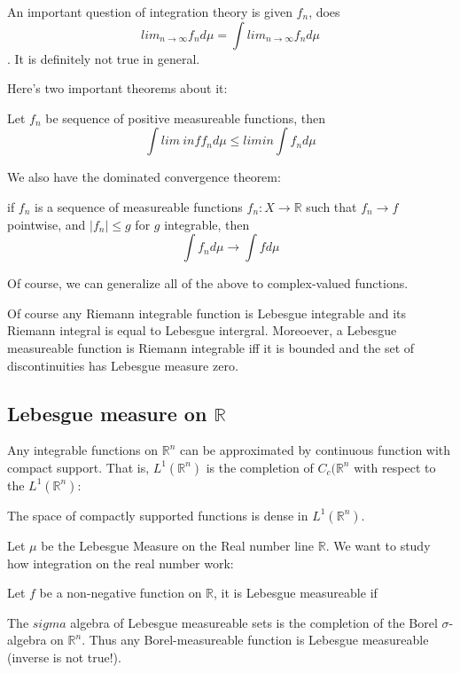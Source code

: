 \documentclass[main.tex]{subfiles}
\begin{document}
An important question of integration theory is given $f_n$, does $$
lim_{n \rightarrow \infty} f_n d \mu = \int lim_{n \rightarrow \infty} f_n d \mu
$$.
It is definitely not true in general. 

Here's two important theorems about it:

\begin{theorem}
Let $f_n$ be sequence of positive measureable functions, then 
$$
\int lim\ inf f_n d\mu \leq lim in \int f_n d\mu
$$
\end{theorem}


We also have the dominated convergence theorem:
\begin{theorem}
if $f_n$ is a sequence of measureable functions $f_n: X \rightarrow \mathbb{R}$ such that $f_n \rightarrow f$ pointwise, and $|f_n| \leq g$ for $g$ integrable, then
$$
\int f_n d\mu \rightarrow \int f d\mu 
$$
\end{theorem}

Of course, we can generalize all of the above to complex-valued functions.

\begin{theorem}
Of course any Riemann integrable function is Lebesgue integrable and its Riemann integral is equal to Lebesgue intergral. Moreoever, a Lebesgue measureable function is Riemann integrable iff it is bounded and the set of discontinuities has Lebesgue measure zero.
\end{theorem}
\subsection{Lebesgue measure on $\mathbb{R}$}

Any integrable functions on $\mathbb{R}^n$ can be approximated by continuous function with compact support. That is, $L^1(\mathbb{R}^n)$ is the completion of $C_c(\mathbb{R}^n$ with respect to the $L^1(\mathbb{R}^n)$:
\begin{theorem}
The space of compactly supported functions is dense in $L^1(\mathbb{R}^n)$.
\end{theorem}

Let $\mu$ be the Lebesgue Measure on the Real number line $\mathbb{R}$. We want to study how integration on the real number work:

\begin{definition}
Let $f$ be a non-negative function on $\mathbb{R}$, it is Lebesgue measureable if 
\end{definition}





\begin{remark}
The $sigma$ algebra of Lebesgue measureable sets is the completion of the Borel $\sigma$-algebra on $\mathbb{R}^n$. Thus any Borel-measureable function is Lebesgue measureable (inverse is not true!).
\end{remark}
\end{document}
